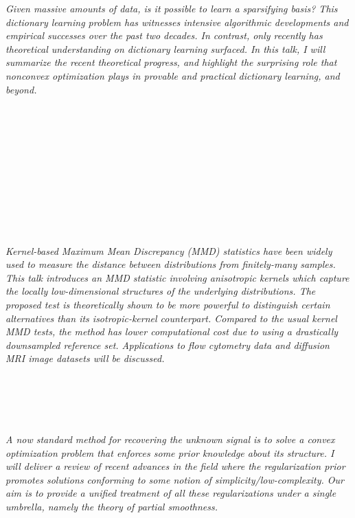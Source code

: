 \begin{multicols}{2}
\\ 
        \\
        \\\\
\\
      \textit{Given massive amounts of data, is it possible to learn a sparsifying basis? This dictionary learning problem has witnesses intensive algorithmic developments and empirical successes over the past two decades. In contrast, only recently has theoretical understanding on dictionary learning surfaced. In this talk, I will summarize the recent theoretical progress, and highlight the surprising role that nonconvex optimization plays in provable and practical dictionary learning, and beyond. }\\
\\ 
        \\
        \\\\
        \\
        \\\\
        \\
        \\\\
\\
      \textit{Kernel-based Maximum Mean Discrepancy (MMD) statistics have been widely used to measure the distance between distributions from finitely-many samples. This talk introduces an MMD statistic involving anisotropic kernels which capture the locally low-dimensional structures of the underlying distributions. The proposed test is theoretically shown to be more powerful to distinguish certain alternatives than its isotropic-kernel counterpart. Compared to the usual kernel MMD tests, the method has lower computational cost due to using a drastically downsampled reference set. Applications to flow cytometry data and diffusion MRI image datasets will be discussed.}\\
\\ 
        \\
        \\\\
\\
      \textit{A now standard method for recovering the unknown signal is to solve a convex optimization problem that enforces some prior knowledge about its structure. I will deliver a review of recent advances in the field where the regularization prior promotes solutions conforming to some notion of simplicity/low-complexity. Our aim is to provide a unified treatment of all these regularizations under a single umbrella, namely the theory of partial smoothness.}\\

\end{multicols}
